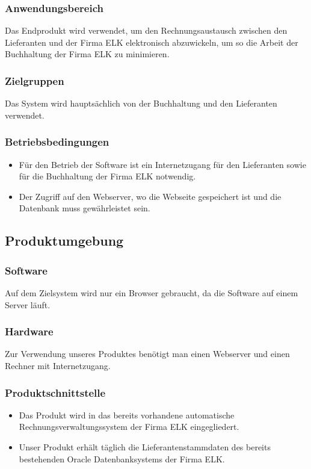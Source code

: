 \subsubsection{Anwendungsbereich}

Das Endprodukt wird verwendet, um den Rechnungsaustausch zwischen den
Lieferanten und der Firma ELK elektronisch abzuwickeln, um so die Arbeit
der Buchhaltung der Firma ELK zu minimieren.


\subsubsection{Zielgruppen}

Das System wird hauptsächlich von der Buchhaltung und den Lieferanten
verwendet.


\subsubsection{Betriebsbedingungen}
\begin{itemize}
\item Für den Betrieb der Software ist ein Internetzugang für den Lieferanten
sowie für die Buchhaltung der Firma ELK notwendig. 
\item Der Zugriff auf den Webserver, wo die Webseite gespeichert ist und
die Datenbank muss gewährleistet sein. 
\end{itemize}

\subsection{Produktumgebung}


\subsubsection{Software}

Auf dem Zielsystem wird nur ein Browser gebraucht, da die Software
auf einem Server läuft.


\subsubsection{Hardware}

Zur Verwendung unseres Produktes benötigt man einen Webserver und
einen Rechner mit Internetzugang.


\subsubsection{Produktschnittstelle}
\begin{itemize}
\item Das Produkt wird in das bereits vorhandene automatische Rechnungsverwaltungssystem
der Firma ELK eingegliedert. 
\item Unser Produkt erhält täglich die Lieferantenstammdaten des bereits
bestehenden Oracle Datenbanksystems der Firma ELK. 
\end{itemize}

